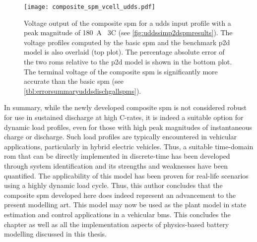 \begin{figure}[!htbp]
    \centering
    \texttt{[image: composite\_spm\_vcell\_udds.pdf]}
    \caption[%
    Terminal voltage output of --- \emph{a}) the  model, \emph{b}) the
    basic , and \emph{c}) the composite  for a
     input profile
    ]%
    {%
        Voltage output of the composite \gls{spm} for a \gls{udds} input profile
        with a peak magnitude of \SI{180}{\ampere} \ie~3C
        (see \cref{fig:uddssimp2dspmresults}). The voltage
        profiles computed by the basic \gls{spm} and the benchmark \gls{p2d}
        model is also overlaid (top plot). The percentage absolute error of the
        two \glspl{rom} relative to the \gls{p2d} model is shown in the bottom
        plot. The terminal voltage of the composite \gls{spm} is significantly
        more accurate than the basic \gls{spm}
        (see \cref{tbl:errorsummaryuddsdischgallspms}).
    }%
    \label{fig:voltageoutputcompareallSPMsudds}
\end{figure}



In  summary, while  the newly  developed composite  \gls{spm} is  not considered
robust for use in  sustained discharge at high C-rates, it  is indeed a suitable
option for  dynamic load profiles, even  for those with high  peak magnitudes of
instantaneous charge or discharge. Such  load profiles are typically encountered
in vehicular  applications, particularly  in hybrid  electric vehicles.  Thus, a
suitable time-domain \gls{rom} that can be directly implemented in discrete-time
has  been  developed  through  system   identification  and  its  strengths  and
weaknesses have been quantified. The applicability of this model has been proven
for real-life  scenarios using a  highly dynamic  load cycle. Thus,  this author
concludes that the  composite \gls{spm} developed here does  indeed represent an
advancement to  the present  modelling art. This  model may now  be used  as the
plant  model  in  state  estimation  and control  applications  in  a  vehicular
\gls{bms}. This concludes the chapter as  well as all the implementation aspects
of physics-based battery modelling discussed in this thesis.



